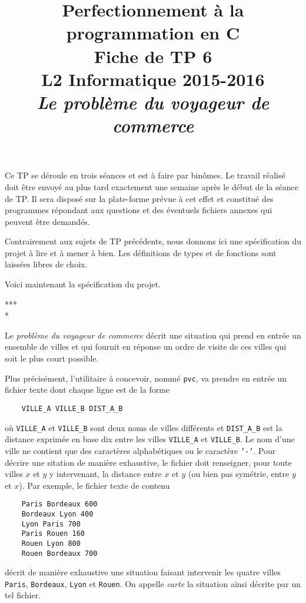 \documentclass[12pt]{article}
\date{}
\title{{\bf Perfectionnement à la programmation en {\sf C}} \\
    Fiche de TP 6 \\
    {\small L2 Informatique 2015-2016} \\
    {\it \small Le problème du voyageur de commerce}}
\theoremstyle{definition}
\begin{document}
 

\maketitle

Ce TP se déroule en trois séances et est à faire par binômes.
Le travail réalisé doit être envoyé au plus tard exactement une
semaine après le début de la séance de TP. Il sera disposé sur
la plate-forme prévue à cet effet et constitué des programmes
répondant aux questions et des éventuels fichiers annexes qui
peuvent être demandés.
\bigskip
\bigskip

Contrairement aux sujets de TP précédents, nous donnons ici une 
spécification du projet à lire et à mener à bien. Les définitions de 
types et de fonctions sont laissées libres de choix.
\bigskip

Voici maintenant la spécification du projet.
\bigskip

\begin{center} *** \\ * \end{center}
Le {\em problème du voyageur de commerce} décrit une situation qui
prend en entrée un ensemble de villes et qui fournit en réponse un ordre 
de visite de ces villes qui soit le plus court possible.
\medskip

Plus précisément, l'utilitaire à concevoir, nommé {\tt pvc}, va prendre 
en entrée un fichier texte dont chaque ligne est de la forme 
\begin{verbatim}
    VILLE_A VILLE_B DIST_A_B
\end{verbatim}
où {\tt VILLE\_A} et {\tt VILLE\_B} sont deux noms de villes différents
et {\tt DIST\_A\_B} est la distance exprimée en base dix entre les villes
{\tt VILLE\_A} et {\tt VILLE\_B}. Le nom d'une ville ne contient
que des caractères alphabétiques ou le caractère {\tt '-'}.
Pour décrire une sitation de manière
exhaustive, le fichier doit renseigner, pour toute villes $x$ et $y$ y 
intervenant, la distance entre $x$ et $y$ (ou bien pas symétrie, entre
$y$ et $x$). Par exemple, le fichier texte de contenu
\begin{verbatim}
    Paris Bordeaux 600
    Bordeaux Lyon 400
    Lyon Paris 700
    Paris Rouen 160
    Rouen Lyon 800
    Rouen Bordeaux 700
\end{verbatim}
décrit de manière exhaustive une situation faisant intervenir les 
quatre villes {\tt Paris}, {\tt Bordeaux}, {\tt Lyon} et {\tt Rouen}.
On appelle {\em carte} la situation ainsi décrite par un tel fichier.
\medskip
\end{document}
